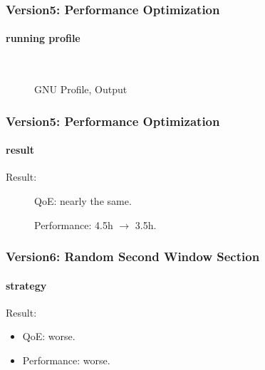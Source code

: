 \documentclass[14pt]{beamer}
\begin{document}
\begin{frame}
\frametitle{Version5: Performance Optimization}
\framesubtitle{running profile}
\begin{figure}
	 \\
	\caption{GNU Profile, Output}
\end{figure}
\end{frame}

\begin{frame}
\frametitle{Version5: Performance Optimization}
\framesubtitle{result}
Result:
\begin{figure}
	\item QoE: nearly the same. 
	\item Performance: 4.5h $\rightarrow$ 3.5h. 
\end{figure}
\end{frame}

\begin{frame}
\frametitle{Version6: Random Second Window Section}
\framesubtitle{strategy}
Result:
\begin{itemize}
	\item QoE: worse. 
	\item Performance: worse. 
\end{itemize}
\end{frame}
\end{document}
